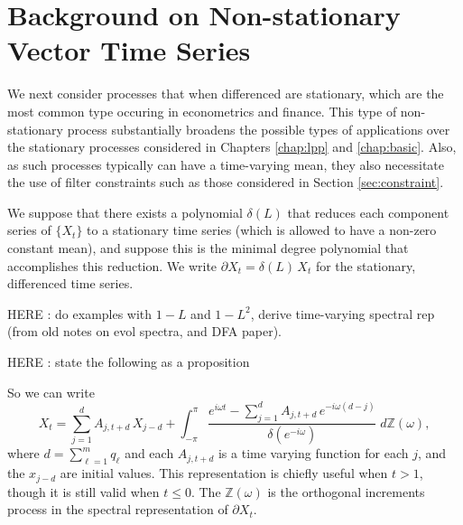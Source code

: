\documentclass[a4paper]{book}
\def\ZZ{\mathbb Z}
\begin{document}
\section{Background on Non-stationary Vector Time Series }
\label{sec:non-stat}

We next consider processes that when differenced are 
stationary, which are the most common type occuring in econometrics and finance.  
 This type of non-stationary process substantially broadens
  the possible types of applications over the stationary processes
   considered in Chapters \ref{chap:lpp} and \ref{chap:basic}.
  Also, as such processes typically can have a time-varying mean,
  they also necessitate the use of filter constraints such as those
   considered in Section \ref{sec:constraint}.
  
 We suppose that there exists a polynomial $\delta (L)$
  that reduces each component series of $\{ X_t \}$ to a stationary
   time series (which is allowed to have a non-zero constant mean),
   and suppose this is the minimal degree polynomial that accomplishes
    this reduction.  We write $\partial X_t = \delta (L) \, X_t$ for
  the stationary, differenced time series.
    
HERE :  do examples with $1-L$  and $1-L^2$, derive time-varying
  spectral rep (from old notes on evol spectra, and DFA paper).
  
  
  HERE : state the following as a proposition
    
So we can write
\[
 X_t = \sum_{j=1}^d A_{j, t+d} \, X_{j-d} + \int_{-\pi}^{\pi}
 \frac{ e^{i \omega t} - \sum_{j=1}^d A_{j,t+d} \, e^{-i \omega
 (d-j)} }{ \delta (e^{-i \omega}) } \; d \ZZ (\omega),
\]
 where $d = \sum_{\ell=1}^m q_{\ell}$ and each $A_{j, t+d}$ is a
 time varying function for each $j$, and the $x_{j-d}$ are initial
 values.  This representation is chiefly useful when $t > 1$, though
 it is still valid when $t \leq 0$.  The $\ZZ (\omega)$ is the
 orthogonal increments process in the spectral representation of
 $\partial X_t$. 
\end{document}
